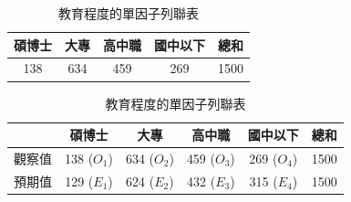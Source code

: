     \begin{table}[htbp]
        \begin{center}
            \begin{tabular}{cccc|c}
                \toprule
                碩博士 & 大專 & 高中職 & 國中以下 & 總和\\
                \hline
                138 & 634 & 459 & 269 & 1500\\
                \bottomrule
            \end{tabular}
            
            \bigskip
            
            \begin{tabular}{c|cccc|c}
                \toprule
                 & 碩博士 & 大專 & 高中職 & 國中以下 & 總和\\
                \hline
                觀察值 & 138 ($O_1$) & 634 ($O_2$) & 459 ($O_3$) & 269 ($O_4$) & 1500\\
                預期值 & 129 ($E_1$) & 624 ($E_2$) & 432 ($E_3$) & 315 ($E_4$) & 1500\\
                \bottomrule
            \end{tabular}
            \caption{教育程度的單因子列聯表\label{tab:one_way_contingency}}
        \end{center}
    \end{table}

